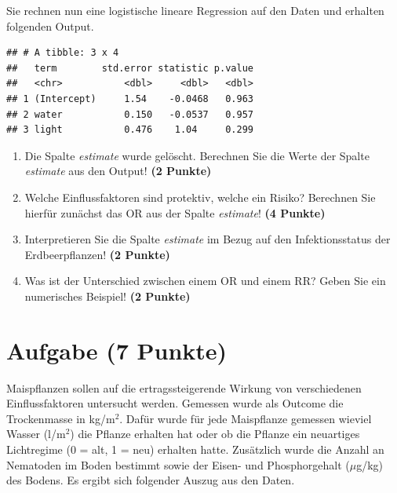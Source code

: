 \documentclass[a4paper, 10pt]{scrartcl}\usepackage[]{graphicx}\usepackage[]{xcolor}
\makeatletter
\newenvironment{kframe}{%
 \def\at@end@of@kframe{}%
 \ifinner\ifhmode%
  \def\at@end@of@kframe{\end{minipage}}%
  \begin{minipage}{\columnwidth}%
 \fi\fi%
 \def\FrameCommand##1{\hskip\@totalleftmargin \hskip-\fboxsep
 \colorbox{shadecolor}{##1}\hskip-\fboxsep
     \hskip-\linewidth \hskip-\@totalleftmargin \hskip\columnwidth}%
 \MakeFramed {\advance\hsize-\width
   \@totalleftmargin\z@ \linewidth\hsize
   \@setminipage}}%
 {\par\unskip\endMakeFramed%
 \at@end@of@kframe}
\newenvironment{knitrout}{}{} %
\makeatother
\begin{document}
Sie rechnen nun eine logistische lineare Regression auf den Daten und erhalten
folgenden \Rlogo Output.

\begin{knitrout}
\color{fgcolor}\begin{kframe}
\begin{verbatim}
## # A tibble: 3 x 4
##   term        std.error statistic p.value
##   <chr>           <dbl>     <dbl>   <dbl>
## 1 (Intercept)     1.54    -0.0468   0.963
## 2 water           0.150   -0.0537   0.957
## 3 light           0.476    1.04     0.299
\end{verbatim}
\end{kframe}
\end{knitrout}


\begin{enumerate}
\item Die Spalte \textit{estimate} wurde gel{\"o}scht. Berechnen Sie die Werte
  der Spalte \textit{estimate} aus den \Rlogo Output! \textbf{(2 Punkte)}
\item Welche Einflussfaktoren sind protektiv, welche ein Risiko? Berechnen
  Sie hierf{\"u}r zun{\"a}chst das OR aus der Spalte \textit{estimate}! \textbf{(4 Punkte)}
\item Interpretieren Sie die Spalte \textit{estimate} im Bezug auf den
  Infektionsstatus der Erdbeerpflanzen! \textbf{(2 Punkte)}
\item Was ist der Unterschied zwischen einem OR und einem RR? Geben Sie ein
  numerisches Beispiel! \textbf{(2 Punkte)}
\end{enumerate}
 
\clearpage

\section{Aufgabe \hfill (7 Punkte)}



Maispflanzen sollen auf die ertragssteigerende Wirkung von verschiedenen
Einflussfaktoren untersucht werden. Gemessen wurde als Outcome die
Trockenmasse in kg/m$^2$. Daf{\"u}r wurde f{\"u}r jede Maispflanze gemessen wieviel
Wasser (l/m$^2$) die Pflanze erhalten hat oder ob die Pflanze ein
neuartiges Lichtregime (0 = alt, 1 = neu) erhalten hatte. Zus{\"a}tzlich wurde
die Anzahl an Nematoden im Boden bestimmt sowie der Eisen- und
Phosphorgehalt ($\mu$g/kg) des Bodens. Es ergibt sich folgender Auszug aus
den Daten.
\end{document}
